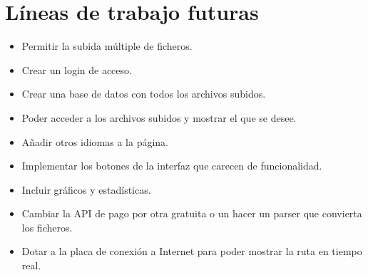 \section{Líneas de trabajo futuras}
\begin{itemize}
	\item
    Permitir la subida múltiple de ficheros.
    \item
    Crear un login de acceso.
    \item
    Crear una base de datos con todos los archivos subidos.
    \item
    Poder acceder a los archivos subidos y mostrar el que se desee.
    \item
    Añadir otros idiomas a la página.
    \item
    Implementar los botones de la interfaz que carecen de funcionalidad.
    \item
    Incluir gráficos y estadísticas.
    \item
    Cambiar la API de pago por otra gratuita o un hacer un parser que convierta los ficheros.
    \item
    Dotar a la placa de conexión a Internet para poder mostrar la ruta en tiempo real.
\end{itemize}